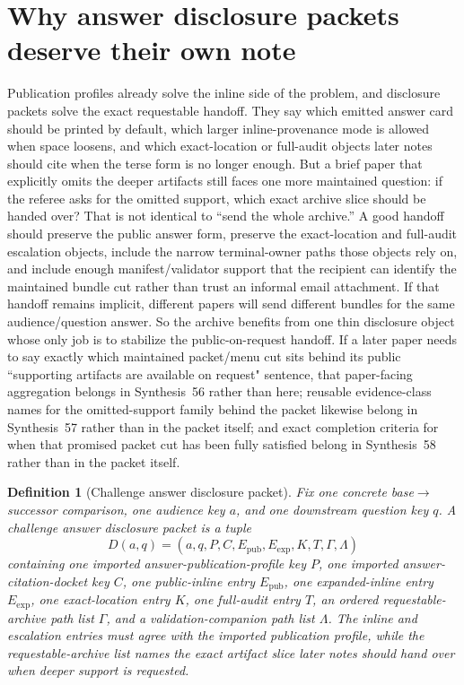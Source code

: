\documentclass[11pt]{article}
\newtheorem{definition}{Definition}
\begin{document}
\section{Why answer disclosure packets deserve their own note}
Publication profiles already solve the inline side of the problem, and disclosure packets solve the exact requestable handoff.
They say which emitted answer card should be printed by default, which larger inline-provenance mode is allowed when space loosens, and which exact-location or full-audit objects later notes should cite when the terse form is no longer enough.
But a brief paper that explicitly omits the deeper artifacts still faces one more maintained question: if the referee asks for the omitted support, which exact archive slice should be handed over?
That is not identical to ``send the whole archive.''
A good handoff should preserve the public answer form, preserve the exact-location and full-audit escalation objects, include the narrow terminal-owner paths those objects rely on, and include enough manifest/validator support that the recipient can identify the maintained bundle cut rather than trust an informal email attachment.
If that handoff remains implicit, different papers will send different bundles for the same audience/question answer.
So the archive benefits from one thin disclosure object whose only job is to stabilize the public-on-request handoff. If a later paper needs to say exactly which maintained packet/menu cut sits behind its public ``supporting artifacts are available on request" sentence, that paper-facing aggregation belongs in Synthesis~56 rather than here; reusable evidence-class names for the omitted-support family behind the packet likewise belong in Synthesis~57 rather than in the packet itself; and exact completion criteria for when that promised packet cut has been fully satisfied belong in Synthesis~58 rather than in the packet itself.\cite{series:publicrequestcontracts,series:requestableevidenceclasses,series:requestfulfillmentcertificates}

\begin{definition}[Challenge answer disclosure packet]
Fix one concrete base$\to$successor comparison, one audience key $a$, and one downstream question key $q$.
A \emph{challenge answer disclosure packet} is a tuple
\[
D(a,q)=(a,q,P,C,E_{\mathrm{pub}},E_{\mathrm{exp}},K,T,\Gamma,\Lambda)
\]
containing one imported answer-publication-profile key $P$, one imported answer-citation-docket key $C$, one public-inline entry $E_{\mathrm{pub}}$, one expanded-inline entry $E_{\mathrm{exp}}$, one exact-location entry $K$, one full-audit entry $T$, an ordered requestable-archive path list $\Gamma$, and a validation-companion path list $\Lambda$.
The inline and escalation entries must agree with the imported publication profile, while the requestable-archive list names the exact artifact slice later notes should hand over when deeper support is requested.
\end{definition}
\end{document}
